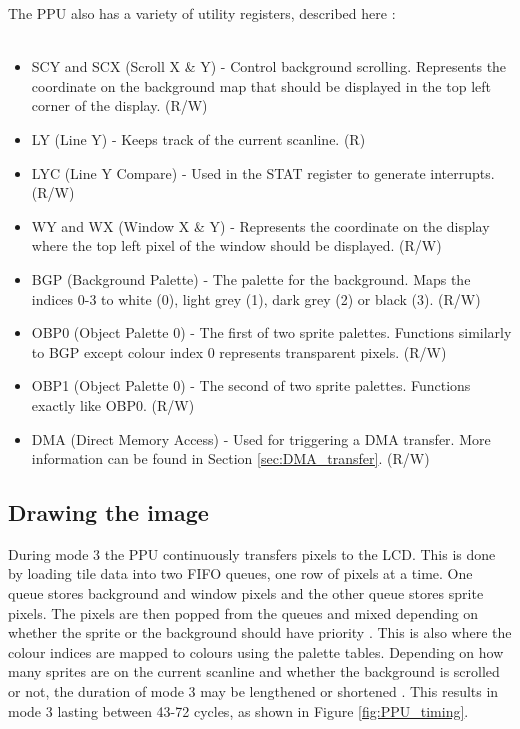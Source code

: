 \vspace{30pt}

The PPU also has a variety of utility registers, described here \cite{pandocsVideo}:\\
\\
\begin{itemize}
    \item SCY and SCX (Scroll X \& Y) - Control background scrolling. Represents the coordinate on the background map that should be displayed in the top left corner of the display. (R/W)
    \item LY (Line Y) - Keeps track of the current scanline. (R)
    \item LYC (Line Y Compare) - Used in the STAT register to generate interrupts. (R/W)
    \item WY and WX (Window X \& Y) - Represents the coordinate on the display where the top left pixel of the window should be displayed. (R/W)
    \item BGP (Background Palette) - The palette for the background. Maps the indices 0-3 to white (0), light grey (1), dark grey (2) or black (3). (R/W)
    \item OBP0 (Object Palette 0) - The first of two sprite palettes. Functions similarly to BGP except colour index 0 represents transparent pixels. (R/W)
    \item OBP1 (Object Palette 0) - The second of two sprite palettes. Functions exactly like OBP0. (R/W)
    \item DMA (Direct Memory Access) - Used for triggering a DMA transfer. More information can be found in Section \ref{sec:DMA_transfer}.  (R/W)
\end{itemize}
\newpage
\subsection{Drawing the image}
\label{sec:PPU_Drawing}
During mode 3 the PPU continuously transfers pixels to the LCD. This is done by loading tile data into two FIFO queues, one row of pixels at a time. One queue stores background  and window pixels and the other queue stores sprite pixels. The pixels are then popped from the queues and mixed depending on whether the sprite or the background should have priority \cite{pandocsDrawing}. This is also where the colour indices are mapped to colours using the palette tables. Depending on how many sprites are on the current scanline and whether the background is scrolled or not, the duration of mode 3 may be lengthened or shortened \cite{pandocsDrawing}. This results in mode 3 lasting between 43-72 cycles, as shown in Figure \ref{fig:PPU_timing}.

